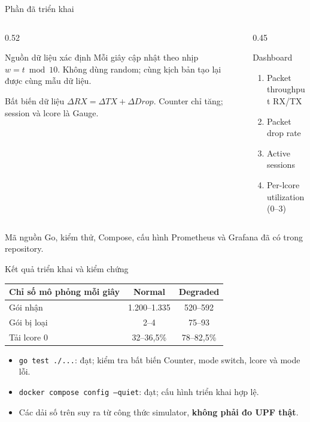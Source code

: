 \documentclass[aspectratio=169,11pt]{beamer}
\newcommand{\code}[1]{\texttt{#1}}
\begin{document}
\begin{frame}{Phần đã triển khai}
\begin{columns}[T]
\begin{column}{0.52\textwidth}
\begin{block}{Nguồn dữ liệu xác định}
Mỗi giây cập nhật theo nhịp \(w=t\bmod 10\). Không dùng random; cùng kịch bản tạo lại được cùng mẫu dữ liệu.
\end{block}
\begin{block}{Bất biến dữ liệu}
\(\Delta RX=\Delta TX+\Delta Drop\). Counter chỉ tăng; session và lcore là Gauge.
\end{block}
\end{column}
\begin{column}{0.45\textwidth}
\begin{block}{Dashboard}
\begin{enumerate}
\item Packet throughput RX/TX
\item Packet drop rate
\item Active sessions
\item Per-lcore utilization (0--3)
\end{enumerate}
\end{block}
\end{column}
\end{columns}
\vspace{0.25cm}
\centering\small Mã nguồn Go, kiểm thử, Compose, cấu hình Prometheus và Grafana đã có trong repository.
\end{frame}

\begin{frame}{Kết quả triển khai và kiểm chứng}
\small
\begin{table}
\centering
\begin{tabular}{lcc}
\toprule
\textbf{Chỉ số mô phỏng mỗi giây} & \textbf{Normal} & \textbf{Degraded} \\
\midrule
Gói nhận & 1.200--1.335 & 520--592 \\
Gói bị loại & 2--4 & 75--93 \\
Tải lcore 0 & 32--36,5\% & 78--82,5\% \\
\bottomrule
\end{tabular}
\end{table}
\vspace{0.2cm}
\begin{itemize}
\item \code{go test ./...}: đạt; kiểm tra bất biến Counter, mode switch, lcore và mode lỗi.
\item \code{docker compose config --quiet}: đạt; cấu hình triển khai hợp lệ.
\item Các dải số trên suy ra từ công thức simulator, \textbf{không phải đo UPF thật}.
\end{itemize}
\end{frame}
\end{document}
